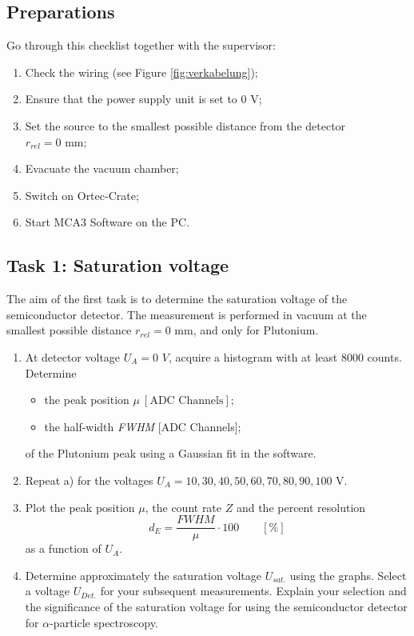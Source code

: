 \subsection{Preparations}
Go through this checklist together with the supervisor:
\begin{enumerate}
	\item Check the wiring (see Figure \ref{fig:verkabelung});
	\item Ensure that the power supply unit is set to $0$ V;
	\item Set the source to the smallest possible distance from the detector \\$r_{rel} = 0$ mm;
	\item Evacuate the vacuum chamber;
	\item Switch on Ortec-Crate;
	\item Start MCA3 Software on the PC.
\end{enumerate}
%
\subsection{Task 1: Saturation voltage}
The aim of the first task is to determine the saturation voltage of the semiconductor detector. The measurement is performed in vacuum at the smallest possible distance $r_{rel} = 0$ mm, and only for Plutonium.
\begin{enumerate}[label=\textbf{\alph*)}]
	\item At detector voltage $U_A = 0$ $V$, acquire a histogram with at least 8000 counts. Determine 
		\begin{itemize}[nosep]
		\item the peak position $\mu\ [\text{ADC Channels}]$;
		\item the half-width \textit{FWHM} [ADC Channels];
	\end{itemize}
	of the Plutonium peak using a Gaussian fit in the software.
	\item Repeat a) for the voltages $U_A = 10, 30, 40, 50, 60, 70, 80, 90, 100$ V.
	\item Plot the peak position $\mu$, the count rate $Z$ and the percent resolution 
		\begin{equation}
			d_E = \frac{\textit{FWHM}}{\mu} \cdot 100 \qquad [\%]
		\end{equation}
	 as a function of $U_A$.
	\item Determine approximately the saturation voltage $U_{sat.}$ using the graphs. Select a voltage $U_{Det.}$ for your subsequent measurements. Explain your selection and the significance of the saturation voltage for using the semiconductor detector for $\alpha$-particle spectroscopy.
\end{enumerate}

